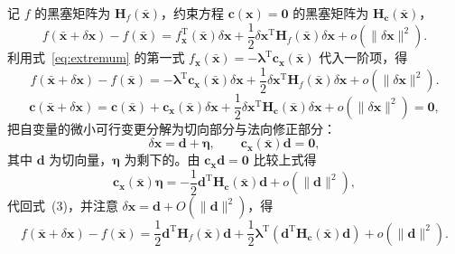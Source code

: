 \documentclass[fontset=fandol,12pt,a4paper]{ctexart}
\begin{document}
记 $f$ 的黑塞矩阵为 $\boldsymbol{H}_{f}(\bar{\boldsymbol{x}})$，约束方程 $\boldsymbol{c}(\boldsymbol{x})=\mathbf{0}$ 的黑塞矩阵为 $\boldsymbol{H}_{\boldsymbol{c}}(\bar{\boldsymbol{x}})$，
\begin{equation}
	f(\bar{\boldsymbol{x}}+\delta \boldsymbol{x})-f(\bar{\boldsymbol{x}})
	= f_{\boldsymbol{x}}^{\mathrm{T}}(\bar{\boldsymbol{x}}) \delta \boldsymbol{x}
	+ \frac{1}{2} \delta \boldsymbol{x}^{\mathrm{T}} \boldsymbol{H}_{f}(\bar{\boldsymbol{x}}) \delta \boldsymbol{x}
	+ o\left(\|\delta \boldsymbol{x}\|^{2}\right) .
\end{equation}
利用式~\eqref{eq:extremum} 的第一式 $f_{\boldsymbol{x}}(\bar{\boldsymbol{x}})=-\boldsymbol{\lambda}^{\mathrm{T}} \boldsymbol{c}_{\boldsymbol{x}}(\bar{\boldsymbol{x}})$ 代入一阶项，得
\begin{equation}
	f(\bar{\boldsymbol{x}}+\delta \boldsymbol{x})-f(\bar{\boldsymbol{x}})
	= -\boldsymbol{\lambda}^{\mathrm{T}} \boldsymbol{c}_{\boldsymbol{x}}(\bar{\boldsymbol{x}}) \delta \boldsymbol{x}
	+ \frac{1}{2} \delta \boldsymbol{x}^{\mathrm{T}} \boldsymbol{H}_{f}(\bar{\boldsymbol{x}}) \delta \boldsymbol{x}
	+ o\left(\|\delta \boldsymbol{x}\|^{2}\right) .
\end{equation}
\[
	\boldsymbol{c}(\bar{\boldsymbol{x}}+\delta \boldsymbol{x})
	= \boldsymbol{c}(\bar{\boldsymbol{x}})
	+ \boldsymbol{c}_{\boldsymbol{x}}(\bar{\boldsymbol{x}}) \delta \boldsymbol{x}
	+ \frac{1}{2} \delta \boldsymbol{x}^{\mathrm{T}} \boldsymbol{H}_{\boldsymbol{c}}(\bar{\boldsymbol{x}}) \delta \boldsymbol{x}
	+ o\left(\|\delta \boldsymbol{x}\|^{2}\right)
	= \mathbf{0} ,
\]
把自变量的微小可行变更分解为切向部分与法向修正部分：
\begin{equation}
	\delta \boldsymbol{x} = \boldsymbol{d} + \boldsymbol{\eta} ,
	\qquad
	\boldsymbol{c}_{\boldsymbol{x}}(\bar{\boldsymbol{x}}) \boldsymbol{d}=\mathbf{0} ,
\end{equation}
其中 $\boldsymbol{d}$ 为切向量，$\boldsymbol{\eta}$ 为剩下的。由 $\boldsymbol{c}_{\boldsymbol{x}} \boldsymbol{d}=\mathbf{0}$ 比较上式得
\[
	\boldsymbol{c}_{\boldsymbol{x}}(\bar{\boldsymbol{x}}) \boldsymbol{\eta}
	=-\frac{1}{2} \boldsymbol{d}^{\mathrm{T}} \boldsymbol{H}_{\boldsymbol{c}}(\bar{\boldsymbol{x}}) \boldsymbol{d}
	+o\left(\|\boldsymbol{d}\|^{2}\right) ,
\]
代回式~(3)，并注意 $\delta \boldsymbol{x}=\boldsymbol{d}+O\left(\|\boldsymbol{d}\|^{2}\right)$，得
\begin{equation}
\label{eq:subst}
	f(\bar{\boldsymbol{x}}+\delta \boldsymbol{x})-f(\bar{\boldsymbol{x}})
	= \frac{1}{2} \boldsymbol{d}^{\mathrm{T}} \boldsymbol{H}_{f}(\bar{\boldsymbol{x}}) \boldsymbol{d}
	+ \frac{1}{2} \boldsymbol{\lambda}^{\mathrm{T}}\left(\boldsymbol{d}^{\mathrm{T}} \boldsymbol{H}_{\boldsymbol{c}}(\bar{\boldsymbol{x}}) \boldsymbol{d}\right)
	+ o\left(\|\boldsymbol{d}\|^{2}\right) .
\end{equation}
\end{document}
